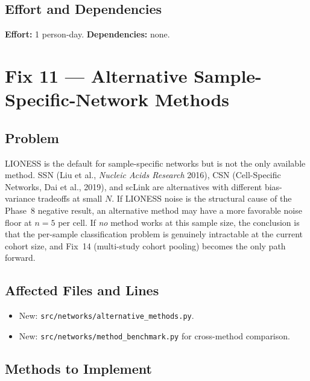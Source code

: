 \documentclass[11pt]{article}
\newcommand{\code}[1]{\texttt{#1}}
\newcommand{\pkg}[1]{\textsf{#1}}
\begin{document}
\subsection{Effort and Dependencies}

\textbf{Effort:} 1 person-day. \textbf{Dependencies:} none.

\section{Fix 11 --- Alternative Sample-Specific-Network Methods}

\subsection{Problem}

LIONESS is the default for sample-specific networks but is not the only available method. SSN (Liu et al., \emph{Nucleic Acids Research} 2016), CSN (Cell-Specific Networks, Dai et al., 2019), and \pkg{scLink} are alternatives with different bias-variance tradeoffs at small $N$. If LIONESS noise is the structural cause of the Phase~8 negative result, an alternative method may have a more favorable noise floor at $n{=}5$ per cell. If \emph{no} method works at this sample size, the conclusion is that the per-sample classification problem is genuinely intractable at the current cohort size, and Fix~14 (multi-study cohort pooling) becomes the only path forward.

\subsection{Affected Files and Lines}

\begin{itemize}[leftmargin=*]
\item New: \code{src/networks/alternative\_methods.py}.
\item New: \code{src/networks/method\_benchmark.py} for cross-method comparison.
\end{itemize}

\subsection{Methods to Implement}
\end{document}
